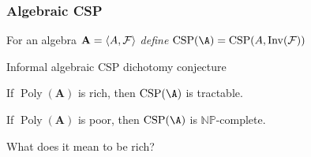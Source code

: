 \documentclass[10pt,xcolor=dvipsnames%
   ]{beamer}
\DeclareMathOperator{\CSP}{CSP}
\DeclareMathOperator{\Poly}{Poly}
\DeclareMathOperator{\Inv}{Inv}
\renewcommand{\.}{\cdot}
\newcommand{\bA}{\ensuremath{\mathbf{A}}}
\newcommand{\sF}{\ensuremath{\mathcal{F}}}
\newcommand{\reduc}{\leq_{\text{\textnormal{p}}}}
\newcommand{\equivp}{\equiv_{\text{\textnormal{p}}}}
\newcommand{\NP}{\ensuremath{\mathbb{NP}}\xspace}
\begin{document}
\begin{frame}
  \frametitle{Algebraic CSP}

  For an algebra $\bA = \<A, \sF\>$ \emph{define}
  $\CSP(\A) = \CSP(A, \Inv(\sF))$

  \bigskip

  \begin{exampleblock}{Informal algebraic CSP dichotomy conjecture}

    \bigskip
    If $\Poly(\bA)$ is rich, then $\CSP(\A)$ is tractable.
    
    \bigskip

    If $\Poly(\bA)$ is poor, then $\CSP(\A)$ is \NP-complete.
  \end{exampleblock}

  \pause

  What does it mean to be rich?


  

\end{frame}
\end{document}
